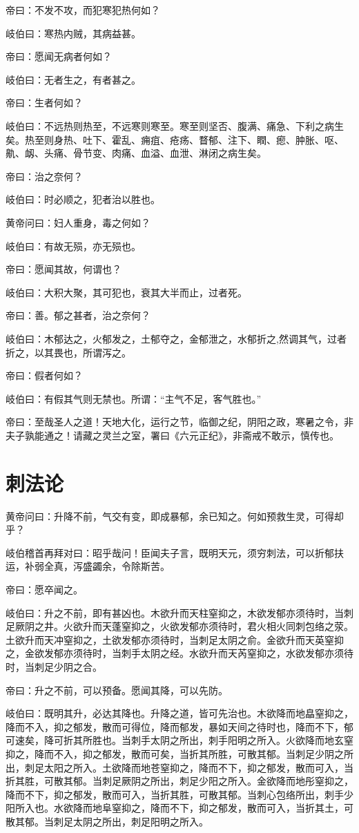 \documentclass{article}%
\begin{document}
帝曰：不发不攻，而犯寒犯热何如？

岐伯曰：寒热内贼，其病益甚。

帝曰：愿闻无病者何如？

岐伯曰：无者生之，有者甚之。

帝曰：生者何如？

岐伯曰：不远热则热至，不远寒则寒至。寒至则坚否、腹满、痛急、下利之病生矣。热至则身热、吐下、霍乱、痈疽、疮疡、瞀郁、注下、瞤、瘛、肿胀、呕、鼽、衂、头痛、骨节变、肉痛、血溢、血泄、淋闭之病生矣。

帝曰：治之奈何？

岐伯曰：时必顺之，犯者治以胜也。

黄帝问曰：妇人重身，毒之何如？

岐伯曰：有故无殒，亦无殒也。

帝曰：愿闻其故，何谓也？

岐伯曰：大积大聚，其可犯也，衰其大半而止，过者死。

帝曰：善。郁之甚者，治之奈何？

岐伯曰：木郁达之，火郁发之，土郁夺之，金郁泄之，水郁折之,然调其气，过者折之，以其畏也，所谓泻之。

帝曰：假者何如？

岐伯曰：有假其气则无禁也。所谓：“主气不足，客气胜也。”

帝曰：至哉圣人之道！天地大化，运行之节，临御之纪，阴阳之政，寒暑之令，非夫子孰能通之！请藏之灵兰之室，署曰《六元正纪》，非斋戒不敢示，慎传也。
\section{刺法论}
黄帝问曰：升降不前，气交有变，即成暴郁，余已知之。何如预救生灵，可得却乎？

岐伯稽首再拜对曰：昭乎哉问！臣闻夫子言，既明天元，须穷刺法，可以折郁扶运，补弱全真，泻盛蠲余，令除斯苦。

帝曰：愿卒闻之。

岐伯曰：升之不前，即有甚凶也。木欲升而天柱窒抑之，木欲发郁亦须待时，当刺足厥阴之井。火欲升而天蓬窒抑之，火欲发郁亦须待时，君火相火同刺包络之荥。土欲升而天冲窒抑之，土欲发郁亦须待时，当刺足太阴之俞。金欲升而天英窒抑之，金欲发郁亦须待时，当刺手太阴之经。水欲升而天芮窒抑之，水欲发郁亦须待时，当刺足少阴之合。

帝曰：升之不前，可以预备。愿闻其降，可以先防。

岐伯曰：既明其升，必达其降也。升降之道，皆可先治也。木欲降而地皛窒抑之，降而不入，抑之郁发，散而可得位，降而郁发，暴如天间之待时也，降而不下，郁可速矣，降可折其所胜也。当刺手太阴之所出，刺手阳明之所入。火欲降而地玄窒抑之，降而不入，抑之郁发，散而可矣，当折其所胜，可散其郁。当刺足少阴之所出，刺足太阳之所入。土欲降而地苍窒抑之，降而不下，抑之郁发，散而可入，当折其胜，可散其郁。当刺足厥阴之所出，刺足少阳之所入。金欲降而地彤窒抑之，降而不下，抑之郁发，散而可入，当折其胜，可散其郁。当刺心包络所出，刺手少阳所入也。水欲降而地阜窒抑之，降而不下，抑之郁发，散而可入，当折其土，可散其郁。当刺足太阴之所出，刺足阳明之所入。
\end{document}
